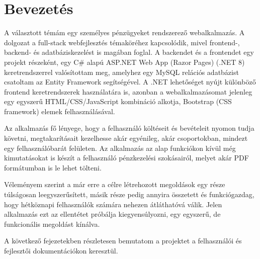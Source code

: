 \chapter{Bevezetés}
\label{ch:intro}

A választott témám egy személyes pénzügyeket rendszerező webalkalmazás. A dolgozat a full-stack webfejlesztés témaköréhez kapcsolódik, mivel frontend-, backend- és adatbáziskezelést is magában foglal. A backendet és a frontendet egy projekt részeként, egy C\# alapú ASP.NET Web App (Razor Pages) (.NET 8) keretrendszerrel valósítottam meg, amelyhez egy MySQL relációs adatbázist csatoltam az Entity Framework segítségével. A .NET lehetőséget nyújt különböző frontend keretrendszerek használatára is, azonban a webalkalmazásomat jelenleg egy egyszerű HTML/CSS/JavaScript kombináció alkotja, Bootstrap (CSS framework) elemek felhasználásával.

Az alkalmazás fő lényege, hogy a felhasználó költéseit és bevételeit nyomon tudja követni, megtakarításait kezelhesse akár egyénileg, akár csoportokban, mindezt egy felhasználóbarát felületen. Az alkalmazás az alap funkciókon kívül még kimutatásokat is készít a felhasználó pénzkezelési szokásairól, melyet akár PDF formátumban is le lehet tölteni.


Véleményem szerint a már erre a célre létrehozott megoldások egy része túlságosan leegyszerűsített, másik része pedig annyira összetett és funkciógazdag, hogy hétköznapi felhasználók számára nehezen átláthatóvá válik. Jelen alkalmazás ezt az ellentétet próbálja kiegyensúlyozni, egy egyszerű, de funkcionális megoldást kínálva.


A következő fejezetekben részletesen bemutatom a projektet a felhasználói és fejlesztői dokumentációkon keresztül.

